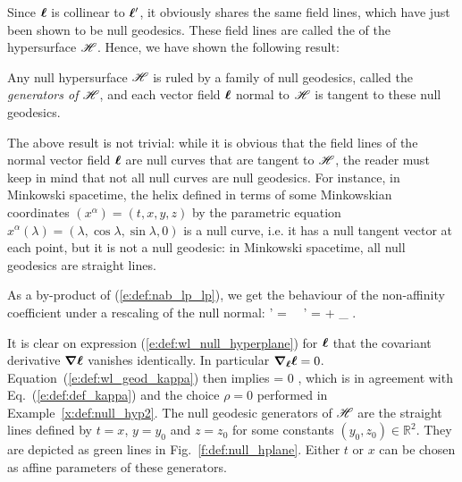 Since $\bm{\ell}$ is collinear to $\bm{\ell}'$, it obviously shares the same field lines,
which have just been shown to be null geodesics. These field lines are called the
 of the hypersurface $\mathscr{H}$.
Hence, we have shown the following result:
\begin{prop}
Any null hypersurface $\mathscr{H}$ is ruled by a family of null geodesics, called the
\emph{generators of $\mathscr{H}$}, and each vector field $\bm{\ell}$ normal to $\mathscr{H}$ is
tangent to these null geodesics.
\end{prop}

\begin{remark}
\label{r:def:null_curves}
The above result is not trivial: while it is obvious that the field lines of the normal
vector field $\bm{\ell}$ are null curves that are tangent to $\mathscr{H}$, the reader must
keep in mind that not all null curves are null geodesics. For instance, in
Minkowski spacetime, the helix defined in terms of
some Minkowskian coordinates $(x^\alpha)=(t,x,y,z)$ by the parametric equation
$x^\alpha(\lambda) = (\lambda, \cos\lambda, \sin\lambda, 0)$ is a null curve, i.e.
it has
a null tangent vector at each point, but it is not a null geodesic: in Minkowski
spacetime, all null geodesics are straight lines.
\end{remark}

As a by-product of (\ref{e:def:nab_lp_lp}), we get the behaviour of the
non-affinity coefficient under a rescaling of the null normal:
\be \label{e:def:rescale_kappa}
    \wl' = \alpha \wl \ \Longrightarrow \ \kappa' = \alpha \kappa + \wnab_{\wl} \alpha .
\ee

\begin{example} \label{x:def:null_hyp3}
It is clear on expression (\ref{e:def:wl_null_hyperplane}) for $\bm{\ell}$ that
the covariant derivative
$\bm{\nabla} \bm{\ell}$ vanishes identically. In particular $\bm{\nabla}_{\bm{\ell}} \bm{\ell} = 0$.
Equation~(\ref{e:def:wl_geod_kappa}) then implies
\be \label{e:def:kappa_0_nullhyp}
    \kappa = 0 ,
\ee
which is in agreement with Eq.~(\ref{e:def:def_kappa}) and the choice $\rho=0$
performed in Example~\ref{x:def:null_hyp2}. The null geodesic generators of $\mathscr{H}$ are the
straight lines defined by $t=x$, $y=y_0$ and $z=z_0$ for some constants
$(y_0,z_0)\in \mathbb{R}^2$.
They are depicted as green lines in Fig.~\ref{f:def:null_hplane}.
 Either $t$ or $x$ can be chosen as affine
parameters of these generators.
\end{example}

